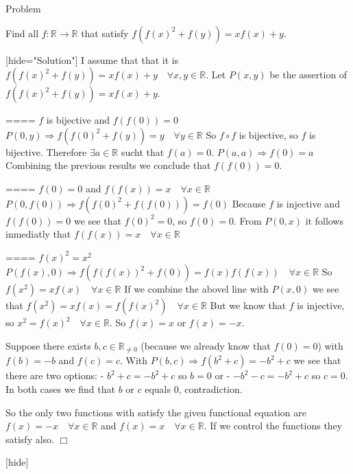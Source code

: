 \begin{solution}
	\begin{bolded}Problem\end{bolded}
Find all $f:\mathbb{R}\to\mathbb{R}$ that satisfy $f(f(x)^2+f(y))=xf(x)+y$.

[hide="Solution"]
I assume that that it is $f(f(x)^2+f(y))=xf(x)+y\quad\forall x,y\in\mathbb{R}$.
Let $P(x,y)$ be the assertion of $f(f(x)^2+f(y))=xf(x)+y$.

==== $f$ is bijective and $f(f(0))=0$
$P(0,y)\Longrightarrow f(f(0)^2+f(y))=y\quad\forall y\in\mathbb{R}$
So $f\circ f $ is bijective, so $f$ is bijective. Therefore $\exists a\in\mathbb{R}$ sucht that $f(a)=0$.
$P(a,a)\Longrightarrow f(0)=a$
Combining the previous results we conclude that $f(f(0))=0$.

==== $f(0)=0$ and $f(f(x))=x\quad\forall x\in\mathbb{R}$
$P(0,f(0))\Longrightarrow f(f(0)^2+f(f(0)))=f(0)$
Because $f$ is injective and $f(f(0))=0$ we see that $f(0)^2=0$, so $f(0)=0$.
From $P(0,x)$ it follows inmediatly that $f(f(x))=x\quad\forall x\in\mathbb{R}$

==== $f(x)^2=x^2$
$P(f(x),0)\Longrightarrow f(f(f(x))^2+f(0))=f(x)f(f(x))\quad\forall x\in\mathbb{R}$
So $f(x^2)=xf(x)\quad\forall x\in\mathbb{R}$
If we combine the abovel line with $P(x,0)$ we see that
$f(x^2)=xf(x)=f(f(x)^2)\quad\forall x\in\mathbb{R}$
But we know that $f$ is injective, so $x^2=f(x)^2\quad\forall x\in\mathbb{R}$.
So $f(x)=x$ or $f(x)=-x$.

Suppose there exists $b,c\in\mathbb{R}_{\neq 0}$ (because we already know that $f(0)=0$) with $f(b)=-b$ 
and $f(c)=c$. With $P(b,c)\Longrightarrow f(b^2+c)=-b^2+c$ we see that there are two options:
- $b^2+c=-b^2+c$ so $b=0$ or
- $-b^2-c=-b^2+c$ so $c=0$.
In both cases we find that $b$ or $c$ equals $0$, contradiction. 

So the only two functions with satisfy the given functional equation are $f(x)=-x\quad\forall x\in\mathbb{R}$ and $f(x)=x\quad\forall x\in\mathbb{R}$. If we control the functions they satisfy also.
$\Box$

[\/hide]
\end{solution}



